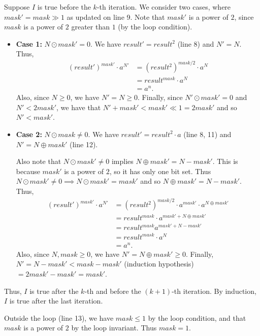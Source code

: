 \documentclass[12pt]{article}
\begin{document}
Suppose $I$ is true before the $k$-th iteration.
We consider two cases, where $mask' = mask \gg 1$ as updated on line 9.
Note that $mask'$ is a power of $2$, since $mask$ is a power of $2$
greater than $1$ (by the loop condition).
\begin{itemize}
    \item \textbf{Case 1:} $N \odot mask' = 0$.
        We have $result' = result^{2}$ (line 8) and $N' = N$.
        Thus,
        \begin{align*}
            (result')^{mask'} \cdot a^{N'} &= (result^{2})^{mask / 2} \cdot a^{N} \\
            &= result^{mask} \cdot a^{N} \\
            &= a^{n}. \tag{by induction hypothesis}
        \end{align*}
        Also, since $N \geq 0$, we have $N' = N \geq 0$.
        Finally, since $N' \odot mask' = 0$ and $N' < 2 mask'$, we have that
        $N' + mask' < mask' \ll 1 = 2 mask'$ and so $N' < mask'$.
    \item \textbf{Case 2:} $N \odot mask \neq 0$.
        We have $result' = result^{2} \cdot a$ (line 8, 11)
        and $N' = N \oplus mask'$ (line 12).

        Also note that $N \odot mask' \neq 0$ implies $N \oplus mask' = N - mask'$.
        This is because $mask'$ is a power of $2$, so it has only one bit set.
        Thus $N \odot mask' \neq 0 \implies N \odot mask' = mask'$ and so
        $N \oplus mask' = N - mask'$.
        Thus,
        \begin{align*}
            (result')^{mask'} \cdot a^{N'} &= (result^{2})^{mask / 2} \cdot a^{mask'} \cdot a^{N \oplus mask'} \\
            &= result^{mask} \cdot a^{mask' + N \oplus mask'} \\
            &= result^{mask} a^{mask' + N - mask'} \\
            &= result^{mask} \cdot a^{N} \\
            &= a^{n}. \tag{by induction hypothesis}
        \end{align*}
        Also, since $N, mask \geq 0$, we have $N' = N \oplus mask' \geq 0$.
        Finally, $N' = N - mask' < mask - mask'$ (induction hypothesis)
        $= 2 mask' - mask' = mask'$.
\end{itemize}
Thus, $I$ is true after the $k$-th and before the $(k+1)$-th iteration.
By induction, $I$ is true after the last iteration.

Outside the loop (line 13), we have $mask \leq 1$ by the loop condition,
and that $mask$ is a power of $2$ by the loop invariant.
Thus $mask = 1$.
\end{document}
